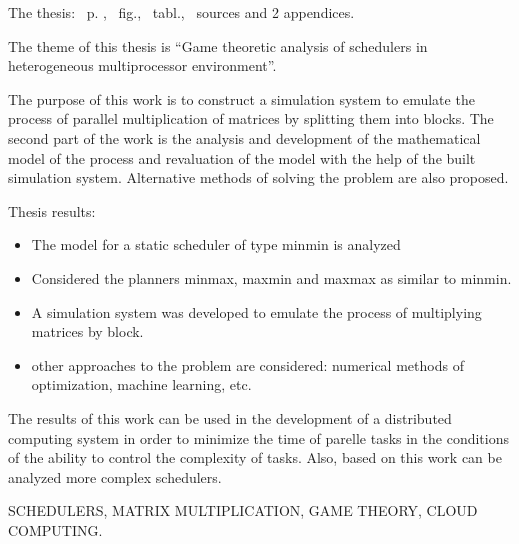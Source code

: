 
The thesis: \pageref*{MyLastPage}~p. , \totfig~fig., \tottab~tabl., ~sources and 2 appendices.

The theme of this thesis is ``Game theoretic analysis of schedulers in heterogeneous multiprocessor environment''.

The purpose of this work is to construct a simulation system to emulate the process of parallel multiplication of matrices by splitting them into blocks. The second part of the work is the analysis and development of the mathematical model of the process and revaluation of the model with the help of the built simulation system. Alternative methods of solving the problem are also proposed.

Thesis results:
\begin{itemize}
	\item The model for a static scheduler of type minmin is analyzed
	\item Considered the planners minmax, maxmin and maxmax as similar to minmin.
	\item A simulation system was developed to emulate the process of multiplying matrices by block.
	\item other approaches to the problem are considered: numerical methods of optimization, machine learning, etc.
\end{itemize}

The results of this work can be used in the development of a distributed computing system in order to minimize the time of parelle tasks in the conditions of the ability to control the complexity of tasks. Also, based on this work can be analyzed more complex schedulers.

\MakeUppercase{Schedulers, matrix multiplication, game theory, cloud computing.} 